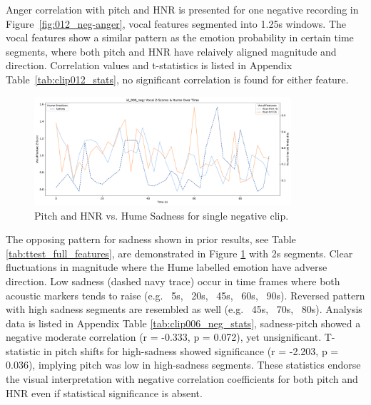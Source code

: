 Anger correlation with pitch and HNR is presented for one negative recording in Figure~\ref{fig:012_neg-anger}, vocal features segmented into 1.25s windows. The vocal features show a similar pattern as the emotion probability in certain time segments, where both pitch and HNR have relaively aligned 
magnitude and direction. Correlation values and t-statistics is listed in Appendix Table~\ref{tab:clip012_stats}, no significant correlation is found for either feature. 

\begin{figure}[H]
    \centering
    \includegraphics[width=0.85\textwidth]{png/results/rq1_nr3/combined_zscore_hume_id_006_neg_7.pdf}
    \caption{Pitch and HNR vs. Hume Sadness for single negative clip.}
    \label{fig:006_neg-sadness}
\end{figure}

The opposing pattern for sadness shown in prior results, see Table \ref{tab:ttest_full_features},  are demonstrated in Figure \ref{fig:006_neg-sadness} with 2s segments. Clear fluctuations in magnitude where the Hume labelled emotion have adverse direction. 
Low sadness (dashed navy trace) occur in time frames where both acoustic markers tends to raise (e.g. ~5s, ~20s, ~45s, ~60s, ~90s). 
Reversed pattern with high sadness segments are resembled as well (e.g. ~45s, ~70s, ~80s). 
Analysis data is listed in Appendix Table \ref{tab:clip006_neg_stats}, sadness-pitch showed a negative moderate correlation (r = -0.333, p = 0.072), yet unsignificant. 
T-statistic in pitch shifts for high-sadness showed significance (r = -2.203, p = 0.036), implying pitch was low in high-sadness segments. These statistics endorse the visual interpretation with negative correlation coefficients for both pitch and HNR even if statistical significance is absent. 


